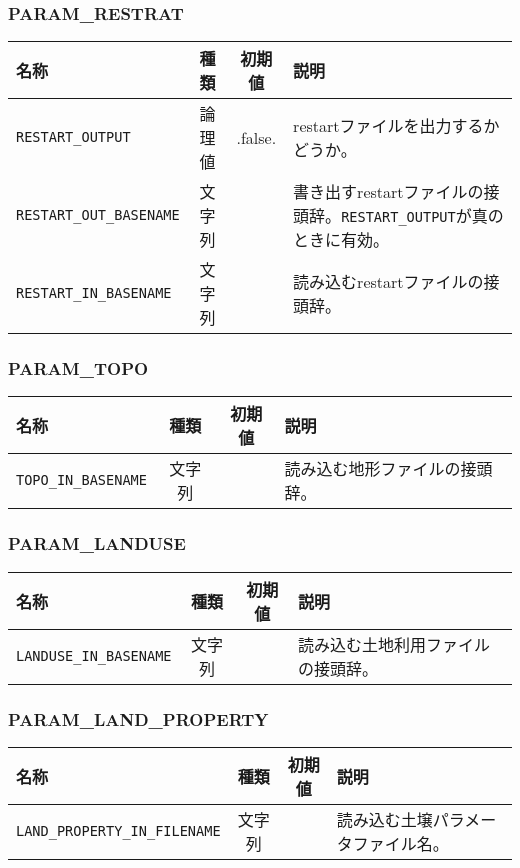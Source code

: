 \subsubsection{PARAM\_RESTRAT}
\begin{tabularx}{150mm}{|l|c|c|X|} \hline
 \rowcolor[gray]{0.9} 名称 & 種類 & 初期値 & 説明 \\ \hline
 \verb|RESTART_OUTPUT| & 論理値 & .false. & restartファイルを出力するかどうか。 \\ \hline
 \verb|RESTART_OUT_BASENAME| & 文字列 &  & 書き出すrestartファイルの接頭辞。\verb|RESTART_OUTPUT|が真のときに有効。 \\ \hline
 \verb|RESTART_IN_BASENAME| & 文字列 &  & 読み込むrestartファイルの接頭辞。 \\ \hline
\end{tabularx}


\subsubsection{PARAM\_TOPO}
\begin{tabularx}{150mm}{|l|c|c|X|} \hline
 \rowcolor[gray]{0.9} 名称 & 種類 & 初期値 & 説明 \\ \hline
 \verb|TOPO_IN_BASENAME| & 文字列 &  & 読み込む地形ファイルの接頭辞。 \\ \hline
\end{tabularx}


\subsubsection{PARAM\_LANDUSE}
\begin{tabularx}{150mm}{|l|c|c|X|} \hline
 \rowcolor[gray]{0.9} 名称 & 種類 & 初期値 & 説明 \\ \hline
 \verb|LANDUSE_IN_BASENAME| & 文字列 &  & 読み込む土地利用ファイルの接頭辞。 \\ \hline
\end{tabularx}


\subsubsection{PARAM\_LAND\_PROPERTY}
\begin{tabularx}{150mm}{|l|c|c|X|} \hline
 \rowcolor[gray]{0.9} 名称 & 種類 & 初期値 & 説明 \\ \hline
 \verb|LAND_PROPERTY_IN_FILENAME| & 文字列 &  & 読み込む土壌パラメータファイル名。 \\ \hline
\end{tabularx}


